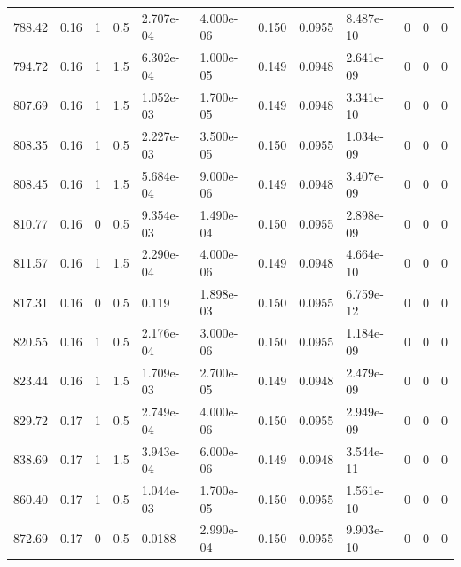 \documentclass[preview]{standalone}
\begin{document}
{{{\begin{tabular}{L{1.2cm}C{1.2cm} C{0.3cm}C{0.5cm} C{1.4cm}C{1.4cm} C{1.4cm}C{1.4cm} C{1.6cm}C{1.6cm} C{1.6cm}C{1.6cm}}
  788.42  &  0.16  & 1     & 0.5 &  2.707e-04  & 4.000e-06  &  0.150&   0.0955& 8.487e-10 & 0   &  0 & 0  \\ 
  794.72  &  0.16  & 1     & 1.5 &  6.302e-04  & 1.000e-05  &  0.149&   0.0948& 2.641e-09 & 0   &  0 & 0  \\ 
  807.69  &  0.16  & 1     & 1.5 &  1.052e-03  & 1.700e-05  &  0.149&   0.0948& 3.341e-10 & 0   &  0 & 0  \\ 
  808.35  &  0.16  & 1     & 0.5 &  2.227e-03  & 3.500e-05  &  0.150&   0.0955& 1.034e-09 & 0   &  0 & 0  \\ 
  808.45  &  0.16  & 1     & 1.5 &  5.684e-04  & 9.000e-06  &  0.149&   0.0948& 3.407e-09 & 0   &  0 & 0  \\ 
  810.77  &  0.16  & 0     & 0.5 &  9.354e-03  & 1.490e-04  &  0.150&   0.0955& 2.898e-09 & 0   &  0 & 0  \\ 
  811.57  &  0.16  & 1     & 1.5 &  2.290e-04  & 4.000e-06  &  0.149&   0.0948& 4.664e-10 & 0   &  0 & 0  \\ 
  817.31  &  0.16  & 0     & 0.5 &  0.119  & 1.898e-03  &  0.150&   0.0955& 6.759e-12 & 0   &  0 & 0  \\ 
  820.55  &  0.16  & 1     & 0.5 &  2.176e-04  & 3.000e-06  &  0.150&   0.0955& 1.184e-09 & 0   &  0 & 0  \\ 
  823.44  &  0.16  & 1     & 1.5 &  1.709e-03  & 2.700e-05  &  0.149&   0.0948& 2.479e-09 & 0   &  0 & 0  \\ 
  829.72  &  0.17  & 1     & 0.5 &  2.749e-04  & 4.000e-06  &  0.150&   0.0955& 2.949e-09 & 0   &  0 & 0  \\ 
  838.69  &  0.17  & 1     & 1.5 &  3.943e-04  & 6.000e-06  &  0.149&   0.0948& 3.544e-11 & 0   &  0 & 0  \\ 
  860.40  &  0.17  & 1     & 0.5 &  1.044e-03  & 1.700e-05  &  0.150&   0.0955& 1.561e-10 & 0   &  0 & 0  \\ 
  872.69  &  0.17  & 0     & 0.5 &  0.0188  & 2.990e-04  &  0.150&   0.0955& 9.903e-10 & 0   &  0 & 0  \\ 
\hline 
\end{tabular} 

}}}
\end{document}
